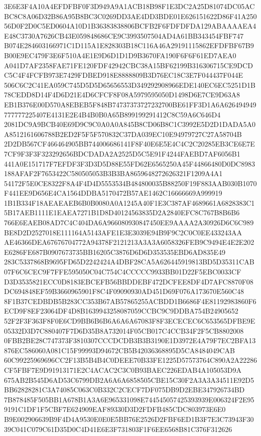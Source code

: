\documentclass[UTF8,fontset=fandol,zihao=-4,a4paper]{ctexart}
\begin{document}
{{3E6E3F4A10A4EFDFBF0F3D949A9A1ACB18B98F1E3DC2A25D81074DC05ACBC8C8A06D32B86A95B8BC3C0269DD3AE4DD3BDE01E626151622D86F41A250
56D0F2D0C5ED0604A10D1B36383838806BCFB2F6FDFDFDA129ABAAAAEA4E48C3730A7626CB43E059848686CE9C3993507504AD4A61BB343454FBF747
B074E284603166971C1D115A1E828303B18C116A46A29191115862EFDFBF67B9B00E9EC479F3E6F510A4E1E9D6D1D1D9B3670FA190F6F6F61ED7AEA0
A041D7AF2358FAE71FE120FDF42942CBC38A15BF62199B316306715CE9DCDC5C4F4FCFB973E7429FDBED918E8888809B3D76EC18C3E7F044437F044E
506C6C2C41EA059C745D5D5D65656553D349292908966EDE140EC6EC5251D1B78CEDD8D14F4D6D21E4D6CFCF8F08A5979595050D1498D6E7CE9D63A8
EB1B376E00D570A8EBEB5F848B74737373727232700BE61FF3D1A6A626494949777777225407E4131E2E4B4B0B0A65B899199291412C8C59A6C646D4
2081DC9A9BCB40E69D9C9C0A0A0A845B8CD06B8C1C3992E5D2D1DADA5A0A8512161606788B2ED2F5F5F570832C37DA039EC10E94979727C27A58704B
2D2DB567CF466464905BB744006686141F8F40E6E5E4C4C2C20285EB3CE6E7E7CF9F3F3F323292656BDCDADA2A2525D5C5E91F4244FAEBD7AF6056B1
441A0E151717F7EFDF3F3D3D5D88E55FD62E6565250A45F44866480D0DC8983188AFAF2F7653422C580505053B3B3BA8659648272626321F1209A4A1
54172F5E0CE8322F8A4F4D4D5553534B484800035B88250F19F883AAB030B1070F441EE9D656E4CA1564DDBA5170472B57AE1462C16666669A999919
1B1B334F18AEAEAEB6B0B0080A0A1245A40F1E3C387AF4689661A6828383C15B17AEB1111E1EAEA7271B1D8D40124563835D2A2840EFC8C767B8B6B6
766E6EAEB08AD7C4C404DA6A966080930847450EE9AAAA2A30926D6C6C989BE8D2D2527018E111164A5143AFE1E3E3039E94B9F9C2C0C0EE433243AA
AE46366DEA67676704772A94378F2121213A3A3A6058326FEB9C9494E4E2E202E6286FE687B0907673735BB16205C3876D6D6D353535EBD6AD835E49
283C5337868B9695FD65D2242424A4DBF28CA5A626445919813BD5D35311CAB07F6C6CEC9F7FFE595050C04C754C4CCCCC9933BB01D22F5EBC0033CF
D3D3535821ECC0D8183EBCEFB56BBDDEBF472DCFEE8DF4D7AFC8870F08DC694848EF59B3660965901F8C4F09090930AD451D69F076A173670E560C48
8F1B37CEDBDB5B283CC353B67AB57865255ACBDD1B6686F4E81192983860F6ECD9F8EF23064DF4D8B1639943258087059CCBC9C9DDBA754B24905652
52F2F3F363F8F0E6CD9BB6B6B6A6A6A67083F8F3ECECEC6C653565DFBE9E05332D3D7C880407F7D6D35B8A732014F05CB017C4CCB34F2F5CB8802008
0FBB2BE28C747373F3810307CCCDCDB3B3B3190E1D3972E4A79F7EC2BFA13876EC586060A081C15F99993D94672CB5B42036368895D5CA8484049CAB
60C99225969696CC2F13B5B4B4C0DEEE70B33FE1225D57573764C890A2A22286CF5FBF7E9D91913171E2C4ACAC2C3C0B93BAEC226EDAB4A105053D9A
675AB2B545D6AD53C6799DB2A6A6A6858505CBE15C30F2A3A3A34511E92D5BB62828281C3A74085C063C0B332C2CECF7DF075DB9D2EBE347926734BD
7B878485F505BB1A678B1A3A6E965331098E744545057425393939E006324F2E959191C1DF1F5CBF7E624909EAF89330D3D2FDFB485CDC803973E6E0
B9E002906639B9F4D4A9530E0E0E5BB76E2526D2FBF6ED1B3F7E3C73943F3039C041C079C61D35D0C4D41E6E3F731803F1F6EE6568B81C376F312626
}}
\end{document}
